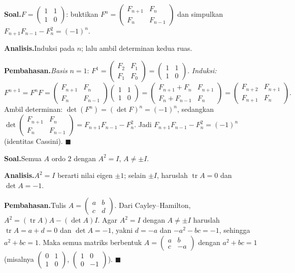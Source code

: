 \documentclass[11pt,a4paper]{report}
\theoremstyle{gaya}
\newcommand{\knomor}[1]{\par\medskip\noindent{\bfseries\color{ungu}#1}\par\nopagebreak}
\newcommand{\ksoal}{\noindent\textbf{\color{biru}Soal.}\space}
\newcommand{\kanalisis}{\par\noindent\textbf{\color{oranye}Analisis.}\space}
\newcommand{\kbahas}{\par\noindent\textbf{\color{hijau}Pembahasan.}\space}
\begin{document}
\knomor{1}
\ksoal $F=\begin{pmatrix}1&1\\1&0\end{pmatrix}$: buktikan $F^n=\begin{pmatrix}F_{n+1}&F_n\\F_n&F_{n-1}\end{pmatrix}$ dan simpulkan $F_{n+1}F_{n-1}-F_n^2=(-1)^n$.
\kanalisis Induksi pada $n$; lalu ambil determinan kedua ruas.
\kbahas \emph{Basis} $n=1$: $F^1=\begin{pmatrix}F_2&F_1\\F_1&F_0\end{pmatrix}=\begin{pmatrix}1&1\\1&0\end{pmatrix}$. \emph{Induksi:}
\[
F^{n+1}=F^nF=\begin{pmatrix}F_{n+1}&F_n\\F_n&F_{n-1}\end{pmatrix}\begin{pmatrix}1&1\\1&0\end{pmatrix}=\begin{pmatrix}F_{n+1}+F_n&F_{n+1}\\F_n+F_{n-1}&F_n\end{pmatrix}=\begin{pmatrix}F_{n+2}&F_{n+1}\\F_{n+1}&F_n\end{pmatrix}.
\]
Ambil determinan: $\det(F^n)=(\det F)^n=(-1)^n$, sedangkan $\det\begin{pmatrix}F_{n+1}&F_n\\F_n&F_{n-1}\end{pmatrix}=F_{n+1}F_{n-1}-F_n^2$. Jadi $F_{n+1}F_{n-1}-F_n^2=(-1)^n$ (identitas Cassini). $\blacksquare$

\knomor{2}
\ksoal Semua $A$ ordo $2$ dengan $A^2=I$, $A\neq\pm I$.
\kanalisis $A^2=I$ berarti nilai eigen $\pm1$; selain $\pm I$, haruslah $\operatorname{tr}A=0$ dan $\det A=-1$.
\kbahas Tulis $A=\begin{pmatrix}a&b\\c&d\end{pmatrix}$. Dari Cayley--Hamilton, $A^2=(\operatorname{tr}A)A-(\det A)I$. Agar $A^2=I$ dengan $A\neq\pm I$ haruslah $\operatorname{tr}A=a+d=0$ dan $\det A=-1$, yakni $d=-a$ dan $-a^2-bc=-1$, sehingga $a^2+bc=1$. Maka semua matriks berbentuk $A=\begin{pmatrix}a&b\\c&-a\end{pmatrix}$ dengan $a^2+bc=1$ (misalnya $\begin{pmatrix}0&1\\1&0\end{pmatrix}$, $\begin{pmatrix}1&0\\0&-1\end{pmatrix}$). $\blacksquare$
\end{document}
